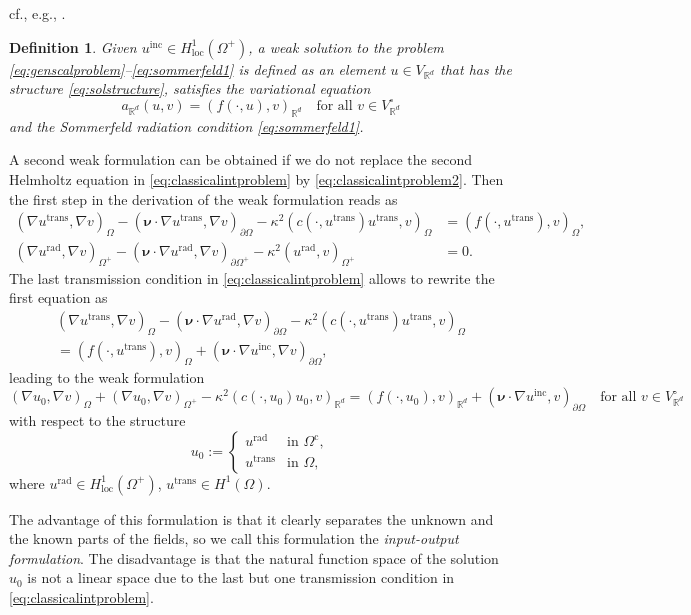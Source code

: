 \documentclass[12pt,DIV=14]{scrartcl}
\newtheorem{definition}{Definition}
\providecommand{\R}{\mathbb{R}}
\providecommand{\Om}{\Omega}
\providecommand{\pOm}{{\partial\Omega}}
\providecommand{\vecnu}{\boldsymbol{\nu}}
\begin{document}
cf., e.g., \cite[Example~21.8]{Wloka:87}.
\begin{definition}
Given $u^\mathrm{inc}\in H^1_\mathrm{loc}(\Om^+)$,
a \emph{weak solution} to the problem \eqref{eq:genscalproblem}--\eqref{eq:sommerfeld1}
is defined as an element $u\in V_{\R^d}$ that has the structure \eqref{eq:solstructure},
satisfies the variational equation
\begin{equation}\label{eq:weakfullspace}
a_{\R^d}(u,v)=(f(\cdot,u),v)_{\R^d}
\quad\text{for all }
v\in V_{\R^d}^\circ
\end{equation}
and the Sommerfeld radiation condition \eqref{eq:sommerfeld1}.
\end{definition}
A second weak formulation can be obtained if we do not replace
the second Helmholtz equation in \eqref{eq:classicalintproblem} by \eqref{eq:classicalintproblem2}.
Then the first step in the derivation of the weak formulation reads as
\begin{align*}
(\nabla u^\mathrm{trans},\nabla v)_\Om - (\vecnu\cdot\nabla u^\mathrm{trans},\nabla v)_{\pOm}
- \kappa^2(c(\cdot,u^\mathrm{trans}) u^\mathrm{trans},v)_\Om
&=(f(\cdot,u^\mathrm{trans}),v)_\Om,\\
(\nabla u^\mathrm{rad},\nabla v)_{\Om^+} - (\vecnu\cdot\nabla u^\mathrm{rad},\nabla v)_{\partial\Om^+}
- \kappa^2(u^\mathrm{rad},v)_{\Om^+}
&=0.
\end{align*}
The last transmission condition in \eqref{eq:classicalintproblem} allows to rewrite
the first equation as
\begin{gather*}
(\nabla u^\mathrm{trans},\nabla v)_\Om
- (\vecnu\cdot\nabla u^\mathrm{rad},\nabla v)_{\pOm}
- \kappa^2(c(\cdot,u^\mathrm{trans}) u^\mathrm{trans},v)_\Om\\
=(f(\cdot,u^\mathrm{trans}),v)_\Om + (\vecnu\cdot\nabla u^\mathrm{inc},\nabla v)_{\pOm},
\end{gather*}
leading to the weak formulation
\[
(\nabla u_0,\nabla v)_\Om + (\nabla u_0,\nabla v)_{\Om^+} - \kappa^2(c(\cdot,u_0) u_0,v)_{\R^d}
=(f(\cdot,u_0),v)_{\R^d}
+ (\vecnu\cdot\nabla u^\mathrm{inc},v)_\pOm
\quad\text{for all }
v\in V_{\R^d}^\circ
\]
with respect to the structure
\[
u_0:=\begin{cases}
u^\mathrm{rad} & \text{in }\Om^\mathrm{c},\\
u^\mathrm{trans} & \text{in }\Om,
\end{cases}
\]
where $u^\mathrm{rad}\in H^1_\mathrm{loc}(\Om^+)$, $u^\mathrm{trans}\in H^1(\Om)$.

The advantage of this formulation is that it clearly separates the unknown
and the known parts of the fields,
so we call this formulation the \emph{input-output formulation}.
The disadvantage is that the natural function space
of the solution $u_0$ is not a linear space due to the last but one
transmission condition in \eqref{eq:classicalintproblem}.
\end{document}
